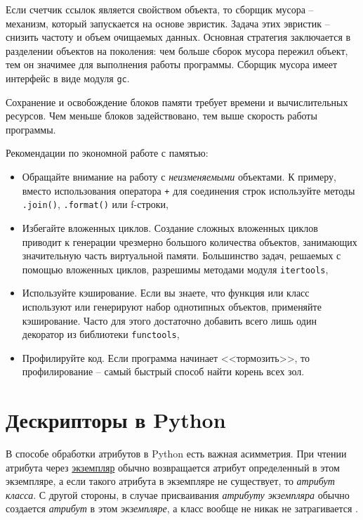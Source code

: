 \documentclass[%
	11pt,
	a4paper,
	utf8,
		]{article}
\begin{document}
Если счетчик ссылок является свойством объекта, то сборщик мусора -- механизм, который запускается на основе эвристик. Задача этих эвристик -- снизить частоту и объем очищаемых данных. Основная стратегия заключается в разделении объектов на поколения: чем больше сборок мусора пережил объект, тем он значимее для выполнения работы программы. Сборщик мусора имеет интерфейс в виде модуля \texttt{gc}.

Сохранение и освобождение блоков памяти требует времени и вычислительных ресурсов. Чем меньше блоков задействовано, тем выше скорость работы программы.

Рекомендации по экономной работе с памятью:
\begin{itemize}
	\item Обращайте внимание на работу с \emph{неизменяемыми} объектами. К примеру, вместо использования оператора \texttt{+} для соединения строк используйте методы \texttt{.join()}, \texttt{.format()} или f-строки,
	
	\item Избегайте вложенных циклов. Создание сложных вложенных циклов приводит к генерации чрезмерно большого количества объектов, занимающих значительную часть виртуальной памяти. Большинство задач, решаемых с помощью вложенных циклов, разрешимы методами модуля \texttt{itertools},
	
	\item Используйте кэширование. Если вы знаете, что функция или класс используют или генерируют набор однотипных объектов, применяйте кэширование. Часто для этого достаточно добавить всего лишь один декоратор из библиотеки \texttt{functools},
	
	\item Профилируйте код. Если программа начинает <<тормозить>>, то профилирование -- самый быстрый способ найти корень всех зол.
\end{itemize}


\section{Дескрипторы в Python}

В способе обработки атрибутов в Python есть важная асимметрия. При чтении атрибута через \underline{экземпляр} обычно возвращается атрибут определенный в этом {экземпляре}, а если такого атрибута в экземпляре не существует, то \emph{атрибут класса}. С другой стороны, в случае присваивания \emph{атрибуту экземпляра} обычно создается \emph{атрибут} в этом \emph{экземпляре}, а класс вообще не никак не затрагивается \cite[]{ramalho:python-2016}.
\end{document}
